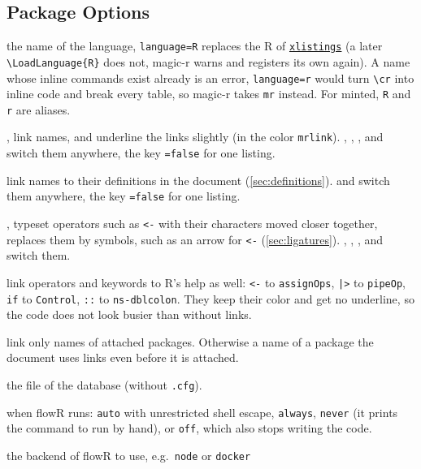 \documentclass[10pt,DIV=12]{scrartcl}
\makeatletter
\let\TT\texttt
\newcommand\pkg[1]{\href{\ifcsname pkgurl@#1\endcsname\csname pkgurl@#1\endcsname\else https://ctan.org/pkg/#1\fi}{\TT{#1}}}
\newcommand\code{\lstinline[language=lLatex,language addons=latex,basicstyle=\ttfamily,columns=flexible,keepspaces]}
\makeatother
\begin{document}
\subsection{Package Options}\label{sec:options}
\begin{description}
\item {} the name of the language, \TT{language=R} replaces the R of \pkg{xlistings}
  (a later \code|\LoadLanguage{R}| does not, magic-r warns and registers its own again). A name
  whose inline commands exist already is an error, \TT{language=r} would turn \TT{\textbackslash cr}
  into inline code and break every table, so magic-r takes \TT{mr} instead. For minted, \TT{R} and
  \TT{r} are aliases.
\item {},  link names, and underline the links slightly
  (in the color \TT{mrlink}). , , , and
   switch them anywhere, the key \TT{=false} for one listing.
\item {} link names to their definitions in the document (\cref{sec:definitions}).
   and  switch them anywhere, the key \TT{=false}
  for one listing.
\item {},  typeset operators such as \TT{<-} with their
  characters moved closer together,  replaces them by symbols, such as an arrow
  for \TT{<-} (\cref{sec:ligatures}). , , ,
  and  switch them.
\item {} link operators and keywords to R's help as well: \TT{<-} to
  \TT{assignOps}, \TT{|>} to \TT{pipeOp}, \TT{if} to \TT{Control}, \TT{::} to \TT{ns-dblcolon}. They
  keep their color and get no underline, so the code does not look busier than without links.
\item {} link only names of attached packages. Otherwise a name of a package
  the document uses links even before it is attached.
\item {} the file of the database (without \TT{.cfg}).
\item {} when flowR runs: \TT{auto} with unrestricted shell escape, \TT{always},
  \TT{never} (it prints the command to run by hand), or \TT{off}, which also stops writing the code.
\item {} the backend of flowR to use, e.g.\ \TT{node} or \TT{docker}

\end{description}
\end{document}
